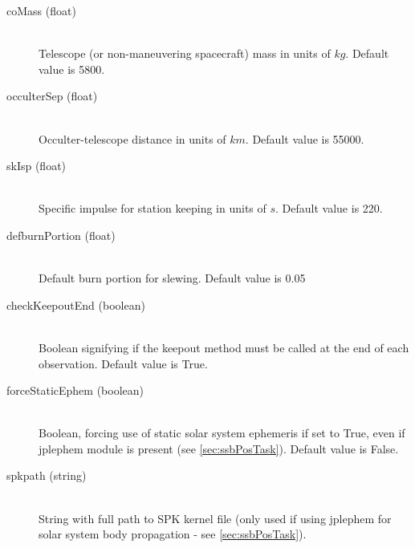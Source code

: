 \documentclass[cleanfoot]{asme2ej}
\begin{document}
\begin{itemize}
\begin{description}
    \item[coMass (float)] \hfill \\ Telescope (or non-maneuvering spacecraft) mass in units of $ kg $. Default value is 5800.
    \item[occulterSep (float)] \hfill \\ Occulter-telescope distance in units of $ km $. Default value is 55000.
    \item[skIsp (float)] \hfill \\ Specific impulse for station keeping in units of $ s $. Default value is 220.
    \item[defburnPortion (float)] \hfill \\ Default burn portion for slewing. Default value is 0.05
    \item[checkKeepoutEnd (boolean)] \hfill \\ Boolean signifying if the keepout method must be called at the end of each observation. Default value is True.
    \item[forceStaticEphem (boolean)] \hfill \\ Boolean, forcing use of static solar system ephemeris if set to True, even if jplephem module is present (see \ref{sec:ssbPosTask}).  Default value is False.
    \item[spkpath (string)] \hfill\\ String with full path to SPK kernel file (only used if using jplephem for solar system body propagation - see \ref{sec:ssbPosTask}).
\end{description}
\end{itemize}
\end{document}
